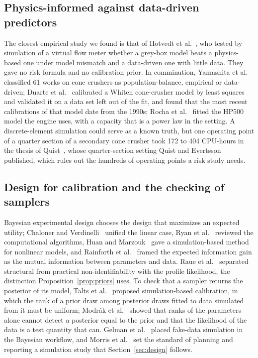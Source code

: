 \subsection{Physics-informed against data-driven predictors}

The closest empirical study we found is that of Hotvedt et al.~\cite{hotvedt}, who tested by simulation of a virtual flow
meter whether a grey-box model beats a physics-based one under model mismatch and a data-driven one with little data. They
gave no risk formula and no calibration prior. In comminution, Yamashita et al.~\cite{yamashita} classified 61 works on cone
crushers as population-balance, empirical or data-driven; Duarte et al.~\cite{duarte} calibrated a Whiten cone-crusher model
by least squares and validated it on a data set left out of the fit, and found that the most recent calibrations of that model
date from the 1990s; Rocha et al.~\cite{rocha} fitted the HP500 model the engine uses, with a capacity that is a power law
in the setting. A discrete-element simulation could serve as a known truth, but one operating point of a quarter section of a
secondary cone crusher took 172 to 404 CPU-hours in the thesis of Quist~\cite{quistthesis}, whose quarter-section setting
Quist and Evertsson~\cite{quist} published, which rules out the hundreds of operating points a risk study needs.

\subsection{Design for calibration and the checking of samplers}

Bayesian experimental design chooses the design that maximizes an expected utility; Chaloner and Verdinelli~\cite{chaloner}
unified the linear case, Ryan et al.~\cite{ryan} reviewed the computational algorithms, Huan and Marzouk~\cite{huan} gave a
simulation-based method for nonlinear models, and Rainforth et al.~\cite{rainforth} framed the expected information gain as
the mutual information between parameters and data. Raue et al.~\cite{raue} separated structural from practical
non-identifiability with the profile likelihood, the distinction Proposition~\ref{prop:priors} uses. To check that a sampler
returns the posterior of its model, Talts et al.~\cite{talts} proposed simulation-based calibration, in which the rank of a
prior draw among posterior draws fitted to data simulated from it must be uniform; Modr\'ak et al.~\cite{modrak} showed that
ranks of the parameters alone cannot detect a posterior equal to the prior and that the likelihood of the data is a test
quantity that can. Gelman et al.~\cite{gelman} placed fake-data simulation in the Bayesian workflow, and Morris et
al.~\cite{morris} set the standard of planning and reporting a simulation study that Section~\ref{sec:design} follows.

